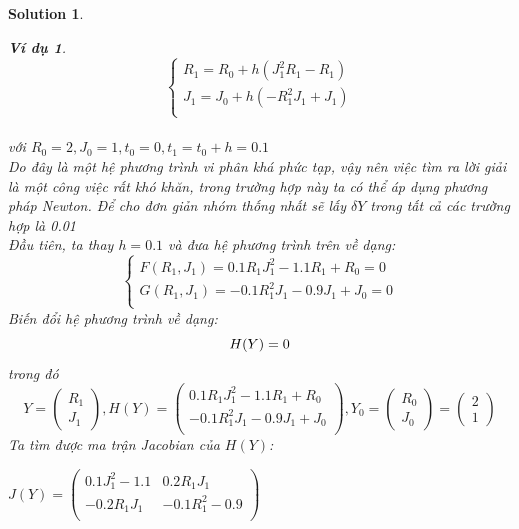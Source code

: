 \documentclass[a4paper]{article}
\newtheorem{example}{Ví dụ}
\newtheorem*{sol}{Solution}
\begin{document}
\begin{sol}
\begin{example}
    $$\begin{cases}
        R_1 = R_0 + h(J_1^2R_1 - R_1) \\
        J_1 = J_0 + h(-R_1^2J_1 + J_1) \\
    \end{cases}$$ \\
    với $R_0 = 2, J_0 = 1, t_0 = 0, t_1 = t_0 + h = 0.1$ \\
    Do đây là một hệ phương trình vi phân khá phức tạp, vậy nên việc tìm ra lời giải là một công việc rất khó khăn, trong trường hợp này ta có thể áp dụng phương pháp Newton. Để cho đơn giản nhóm thống nhất sẽ lấy $\delta Y$ trong tất cả các trường hợp là 0.01 \\
    Đầu tiên, ta thay $h = 0.1$ và đưa hệ phương trình trên về dạng:\\ 
    $$\begin{cases}
        F(R_1, J_1) = 0.1R_1J_1^2 - 1.1R_1 + R_0 = 0 \\
        G(R_1, J_1) = -0.1R_1^2J_1 - 0.9J_1 + J_0 = 0\\ 
    \end{cases} $$
    Biến đổi hệ phương trình về dạng: \\
    \begin{equation} \notag
     H(Y) = 0 \\
    \end{equation}
     trong đó {$$Y=\begin{pmatrix}
    R_1\\ J_1
\end{pmatrix},H(Y)=\begin{pmatrix}
    0.1R_1J_1^2 - 1.1R_1 + R_0 \\
    -0.1R_1^2J_1 - 0.9J_1 + J_0  \\
\end{pmatrix}, Y_0=\begin{pmatrix}
    R_0 \\ J_0
\end{pmatrix} = \begin{pmatrix}
    2 \\ 1
\end{pmatrix}$$}
    Ta tìm được ma trận Jacobian của $H(Y)$: \\
\begin{center}
    \begin{math}
        J(Y) = \begin{pmatrix}
            0.1J_1^2 -1.1 & 0.2R_1J_1 \\
            -0.2R_1J_1 & -0.1R_1^2 - 0.9 \\
            

\end{pmatrix}
\end{math}
\end{center}
\end{example}
\end{sol}
\end{document}
